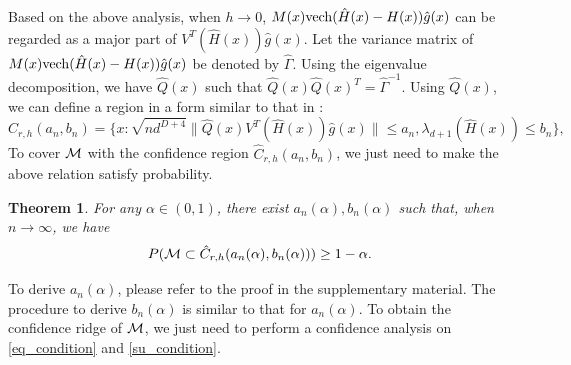 \documentclass[aos,preprint]{imsart}
\newtheorem{theorem}{Theorem}[section]
\theoremstyle{remark}
\begin{document}
Based on the above analysis, when $h\rightarrow 0$, $M(x){\rm vech}(\hat{H}(x)-H(x))\hat{g}(x)$ can be regarded as a major part of $V^T({\hat{H}}(x))\hat{g}(x)$. Let the variance matrix of $M(x){\rm vech}(\hat{H}(x)-H(x))\hat{g}(x)$ be denoted by $\hat{\Gamma}$. Using the eigenvalue decomposition, we have $\hat{Q}(x)$ such that $\hat{Q}(x)\hat{Q}(x)^T = \hat{\Gamma}^{-1} $. Using $\hat{Q}(x)$, we can define a region in a form similar to that in \cite{qiao2020asymptotic}:
\[
\hat{C}_{r,h}(a_n, b_n) = \{x: \sqrt{nd^{D+4}}\|\hat{Q}(x) {V}^T({\hat{H}}(x))\hat{g}(x)\|\leq a_n, \lambda_{d+1}(\hat{H}(x))\leq b_n\},
\]
To cover $\cal M$ with the confidence region $\hat{C}_{r,h}(a_n, b_n)$, we just need to make the above relation satisfy probability.
\begin{theorem}\label{confidence}
For any $\alpha\in(0,1)$, there exist $a_n(\alpha), b_n(\alpha)$ such that, when $n\rightarrow \infty$, we have
\[
P({\cal M}\subset \hat{C}_{r,h}(a_n(\alpha), b_n(\alpha)) ) \geq 1-\alpha.
\]
\end{theorem}
To derive $a_n(\alpha)$, please refer to the proof in the supplementary material. %
The procedure to derive $b_n(\alpha)$ is similar to that for $a_n(\alpha)$.
 To obtain the confidence ridge of $\cal M$, we just need to perform a confidence analysis on \eqref{eq_condition} and \eqref{su_condition}.
\end{document}
